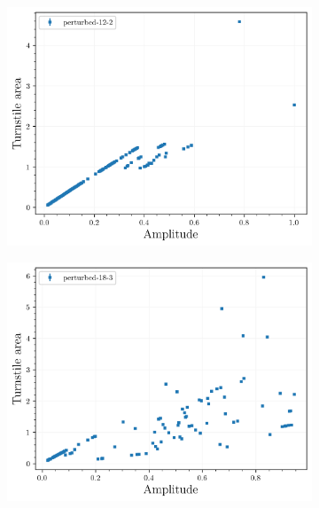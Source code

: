 \begin{figure}[H]
    \centering
    \begin{subfigure}{0.49\textwidth}
        \centering
        \includegraphics[width=\textwidth]{images/amplitudescan/turnstile_area_12_2.png}
        \caption{}
        \label{fig:scan-big1}
    \end{subfigure}
    \begin{subfigure}{0.49\textwidth}
        \centering
        \includegraphics[width=\textwidth]{images/amplitudescan/turnstile_area_18_3.png}
        \caption{}
        \label{fig:scan-big2}
    \end{subfigure}
    \caption{}
    \label{fig:scan-big}
\end{figure}

